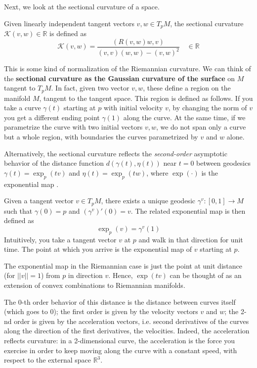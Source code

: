 \documentclass[a4paper,12pt,reqno]{amsbook}
\theoremstyle{definition} %
\newcommand{\1}{\mathbbm{1}}
\newcommand{\R}{\ensuremath{\mathbb{R}}}
\theoremstyle{plain}
\theoremstyle{remark}
\begin{document}
Next, we look at the sectional curvature of a space.
\begin{definition}
    Given linearly independent tangent vectors $v,w \in T_pM$, the sectional curvature $\mathcal{K}(v,w) \in \mathbb{R}$ is defined as 
    \[
    \mathcal K(v,w) = \frac{(R(v,w)w,v)}{(v,v)(w,w) - (v,w)^2} \quad \in \R
    \]
\end{definition}

This is some kind of normalization of the Riemannian curvature. We can think of the \textbf{sectional curvature as the Gaussian curvature of the surface} on $M$ tangent to $T_pM$. In fact, given two vector $v,w$, these define a region on the manifold $M$, tangent to the tangent space. This region is defined as follows. If you take a curve $\gamma(t)$ starting at $p$ with initial velocity $v$, by changing the norm of $v$ you get a different ending point $\gamma(1)$ along the curve. At the same time, if we parametrize the curve with two initial vectors $v,w$, we do not span only a curve but a whole region, with boundaries the curves parametrized by $v$ and $w$ alone. 

Alternatively, the sectional curvature reflects the \emph{second-order} asymptotic behavior of the distance function $d(\gamma(t), \eta(t))$ near $t=0$ between geodesics $\gamma(t)=\exp_p(tv)$ and $\eta(t)=\exp_p(tw)$, where $\exp(\cdot)$ is the exponential map \cite{Ohta_2014}. 

\begin{definition} \label{def: exp}
    Given a tangent vector $v \in T_pM$, there exists a unique geodesic $\gamma^v :[0,1]\to M$ such that $\gamma(0)=p$ and $(\gamma^v)'(0)=v$. The related exponential map is then defined as 
    \[
    \exp_p(v) = \gamma^v(1)
    \]
    Intuitively, you take a tangent vector $v$ at $p$ and walk in that direction for unit time. The point at which you arrive is the exponential map of $v$ starting at $p$.

    The exponential map in the Riemannian case is just the point at unit distance (for $||v||=1$) from $p$ in direction $v$. Hence, $\exp(tv)$ can be thought of as an extension of convex combinations to Riemannian manifolds.
\end{definition}

The 0-th order behavior of this distance is the distance between curves itself (which goes to 0); the first order is given by the velocity vectors $v$ and $w$; the 2-nd order is given by the acceleration vectors, i.e. second derivatives of the curves along the direction of the first derivatives, the velocities. Indeed, the acceleration reflects curvature: in a 2-dimensional curve, the acceleration is the force you exercise in order to keep moving along the curve with a constant speed, with respect to the external space $\R^3$. 
\\
\end{document}
